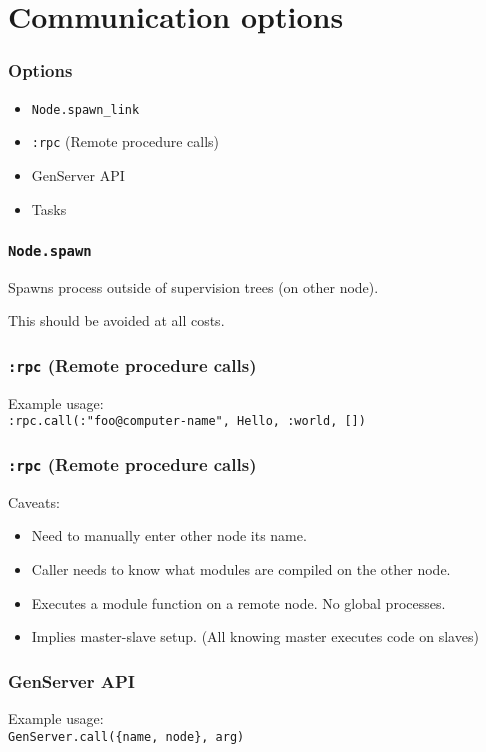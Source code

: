 \section{Communication options}

\frame{\tableofcontents[currentsection]}

\begin{frame}
    \frametitle{Options}
    \begin{itemize}
        \item \texttt{Node.spawn\_link}
        \item \texttt{:rpc} (Remote procedure calls)
        \item GenServer API
        \item Tasks
    \end{itemize}
\end{frame}

\begin{frame}
    \frametitle{\texttt{Node.spawn}}
    Spawns process outside of supervision trees (on other node). 
    
    \vfill

    This should be avoided at all costs.
\end{frame}

\begin{frame}
    \frametitle{\texttt{:rpc} (Remote procedure calls)}
    Example usage: \\
    \texttt{:rpc.call(:"foo@computer-name", Hello, :world, [])}
    \vfill
\end{frame}

\begin{frame}
    \frametitle{\texttt{:rpc} (Remote procedure calls)}
    Caveats: 
    \begin{itemize}
        \item Need to manually enter other node its name.
        \item Caller needs to know what modules are compiled on the other node.
        \item Executes a module function on a remote node. No global processes.
        \item Implies master-slave setup. (All knowing master executes code on slaves)
    \end{itemize}
\end{frame}

\begin{frame}
    \frametitle{GenServer API}
    Example usage: \\
    \texttt{GenServer.call(\{name, node\}, arg)}
    \vfill
\end{frame}

